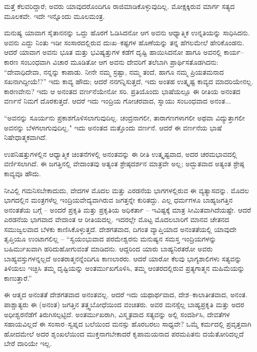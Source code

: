 \vskip 4pt

ಮತ್ತೆ ಕೆಲವರಿದ್ದಾರೆ; ಅವರು ಯಾವುದರೊಂದಿಗೂ ರಾಜಿಮಾಡಿಕೊಳ್ಳುವುದಿಲ್ಲ. ಮೋಕ್ಷಕ್ಕಿರುವ ಮಾರ್ಗ ಸತ್ಯದ ಮೂಲಕವೇ. ಇದೇ ಇನ್ನೊಂದು ಮೂಲಮಂತ್ರ.

\vskip 4pt

ಮನುಷ್ಯ ಯಾವಾಗ ಸೈತಾನನನ್ನು ಒದ್ದು ಹೊರಗೆ ಓಡಿಸಿದನೋ ಆಗ ಅವನು ಆಧ್ಯಾತ್ಮಿಕ ಉನ್ನತಿಯನ್ನು ಸಾಧಿಸಿದನು. ಅವನು ಎದ್ದು ನಿಂತು ಇಡೀ ಸಂಸಾರದಲ್ಲಿರುವ ದುಃಖ–ಕಷ್ಟಗಳ ಹೊಣೆಯನ್ನು ತನ್ನ ಹೆಗಲಮೇಲೆ ಹೇರಿಕೊಂಡನು. ಆದರೆ ಯಾವಾಗ ಅವನು ಭೂತ ಮತ್ತು ಭವಿಷ್ಯತ್ತುಗಳ ಕಡೆಗೆ ದೃಷ್ಟಿ ಹಾಯಿಸಿದನೋ ಹಾಗೂ ಅವನಲ್ಲಿ ಕಾರ್ಯ–ಕಾರಣ ಸಂಬಂಧವಾಗಿ ವಿಚಾರ ಮೂಡಿತೋ ಆಗ ಅವನು ದೇವರಿಗೆ ತಲೆಬಾಗಿ ಪ್ರಾರ್ಥಿಸತೊಡಗಿದನು: “ದೇವಾಧಿದೇವಾ, ನನ್ನನ್ನು ಕಾಪಾಡು. ನೀನೇ ನಮ್ಮ ಸ್ರಷ್ಟಾ, ನಮ್ಮ ತಂದೆ, ಹಾಗೂ ನಮ್ಮ ಪ್ರಿಯತಮನಾದ ಸಖನಾಗಿದ್ದೀಯೆ!?” ಇದು ಕಾವ್ಯ ಹೌದು; ಆದರೆ ನನಗನ್ನಿಸುತ್ತದೆ, ಇದು ಅಂತಹ ಉತ್ಕೃಷ್ಟ ಕಾವ್ಯದ ಮಾದರಿಯೇನಲ್ಲ. ಕಾರಣವೇನು? ಇದು ಆ ಅನಂತದ ವರ್ಣನೆಯೇನೋ ಸರಿ. ಪ್ರತಿಯೊಂದು ಭಾಷೆಯಲ್ಲೂ ಈ ರೀತಿಯ ಅನಂತದ ವರ್ಣನೆ ನಿಮಗೆ ದೊರಕುತ್ತದೆ. ಆದರೆ ಇದು ಇಂದ್ರಿಯ ಗೋಚರವಾದ, ಸ್ನಾಯು ಸಂಬಂಧವಾದ ಅನಂತ...

\vskip 4pt

“ಅವನನ್ನು ಸೂರ್ಯನು ಪ್ರಕಾಶಗೊಳಿಸಲಾಗುವುದಿಲ್ಲ. ಚಂದ್ರನಾಗಲೀ, ತಾರಾಗಣಗಳಾಗಲೀ ಅಥವಾ ವಿದ್ಯುತ್ತಾಗಲೀ ಅವನನ್ನು ಬೆಳಗಲಾಗುವುದಿಲ್ಲ." ಇದು ಅನಂತದ ಮತ್ತೊಂದು ವರ್ಣನೆ. ಆದರೆ ಈ ವರ್ಣನೆಯ ಭಾಷೆ ನಿಷೇಧಾತ್ಮಕವಾಗಿದೆ.

\vskip 4pt

ಉಪನಿಷತ್ತುಗಳಲ್ಲಿನ ಆಧ್ಯಾತ್ಮಿಕ ಚಿಂತನೆಗಳಲ್ಲಿ ಅನಂತವನ್ನು ಈ ರೀತಿ ಉತ್ಕೃಷ್ಟವಾದ, ಅದರ ಚರಮಭಾವದಲ್ಲಿ ವರ್ಣಿಸಲಾಗಿದೆ. ಈ ಜಗತ್ತಿನಲ್ಲಿ ವೇದಾಂತವು ಅತ್ಯಂತ ಶ್ರೇಷ್ಠದರ್ಶನ ಮಾತ್ರವೇ ಅಲ್ಲ; ಅದ್ಭುತವಾದ ಅತ್ಯಂತ ಶ್ರೇಷ್ಠ ಕಾವ್ಯವೂ ಹೌದು.

\vskip 4pt

ನೀವಿಲ್ಲಿ ಗಮನಿಸಬೇಕಾದುದು, ವೇದಗಳ ಮೊದಲ ಮತ್ತು ಎರಡನೆಯ ಭಾಗಗಳಲ್ಲಿರುವ ಈ ವ್ಯತ್ಯಾಸವನ್ನು. ಮೊದಲ ಭಾಗದಲ್ಲಿನ ಮಂತ್ರಗಳೆಲ್ಲ ಇಂದ್ರಿಯವೇದ್ಯವಾಗಿರುವ ಜಗತ್ತನ್ನೇ ಕುರಿತದ್ದು. ಎಲ್ಲ ಧರ್ಮಗಳೂ ಬಾಹ್ಯಜಗತ್ತಿನ ಅನಂತತೆಯ ಬಗ್ಗೆ – ಅಂದರೆ ಪ್ರಕೃತಿ ಮತ್ತು ಪ್ರಕೃತಿಯ ಅಧಿಕರ್ತಾ – ಇವಿಷ್ಟಕ್ಕೆ ಮಾತ್ರ ಸೀಮಿತವಾಗಿದೆಯಷ್ಟೇ. ಆದರೆ ಎರಡನೆಯ ಭಾಗವಾದ ವೇದಾಂತ ಆ ರೀತಿಯದಲ್ಲ. ಇದರಲ್ಲೇ ಮೊಟ್ಟ ಮೊದಲಬಾರಿಗೆ ಮಾನವ ಚೇತನದ ಸಮುಜ್ವಲವಾದ ಬೆಳಕು ಕಾಣಿಸಿಕೊಳ್ಳುತ್ತದೆ. ದೇಶಗತವಾದ, ದಿಗಂತ ವ್ಯಾಪ್ತಿಯಾದ ಅನಂತತೆಯಲ್ಲಿ ಯಾವುದೇ ತೃಪ್ತಿಯೂ ಉಂಟಾಗಲಿಲ್ಲ – “ಸ್ವಯಂಭುವಾದ ಪರಮೇಶ್ವರನು ಮನುಷ್ಯನ ಸಮಸ್ತ ಇಂದ್ರಿಯಗಳನ್ನು ಬಹಿರ್ಮುಖವಾಗಿ ಹರಿದುಹೋಗುವಂತೆ ಮಾಡಿದನು. ಆದ್ದರಿಂದ ಯಾರು ಬಾಹ್ಯನಿರತರೋ ಅವರು ಬಾಹ್ಯವಸ್ತುಗಳನ್ನಲ್ಲದೆ ಅಂತರಾತ್ಮನನ್ನೆಂದಿಗೂ ಕಾಣಲಾರರು. ಆದರೆ ಯಾರೋ ಕೆಲವು ಭಾಗ್ಯಶಾಲಿಗಳು ಸತ್ಯವನ್ನು ತಿಳಿಯಲು ಇಚ್ಛಿಸಿ ತಮ್ಮ ದೃಷ್ಟಿಯನ್ನು ಅಂತರ್ಮುಖಗೊಳಿಸಿ, ತಮ್ಮ ಆಂತರದಲ್ಲಿರುವ ಪ್ರತ್ಯಗಾತ್ಮನ ಮಹಿಮೆಯನ್ನು ಕಾಣುತ್ತಾರೆ.”

\vskip 4pt

ಈ ಆತ್ಮದ ಅನಂತತೆ ದೇಶಗತವಾದ ಅನಂತವಲ್ಲ. ಆದರೆ ಇದು ಯಥಾರ್ಥವಾದ, ದೇಶ–ಕಾಲಾತೀತವಾದ, ಅನಂತ. ಪಾಶ್ಚಾತ್ಯರು ಈ (ಅನಂತ) ಜಗತ್ತಿನ ತತ್ತ್ವಬೋಧೆಯಿಂದ ವಂಚಿತರು. ಅವರ ಮನಸ್ಸೆಲ್ಲ ಬಾಹ್ಯಪ್ರಕೃತಿ ಮತ್ತು ಅದರ ಅಧೀಶ್ವರನೆಡೆಗೆ ತಿರುಗಿಸಲ್ಪಟ್ಟಿದೆ. ಅಂತರ್ಮುಖರಾಗಿ, ವಿಸ್ಮೃತವಾದ ಸತ್ಯವನ್ನು ಅಲ್ಲಿ ಸಂದರ್ಶಿಸಿ, ದೇವತೆಗಳ ಸಹಾಯವಿಲ್ಲದೆ ಈ ಸಂಸಾರ–ಸ್ವಪ್ನದ ಬಲೆಯಿಂದ ಮನಸ್ಸು ಹೊರಬರಲು ಸಾಧ್ಯವೇ? ಒಮ್ಮೆ ಕರ್ಮದಲ್ಲಿ ಪ್ರವೃತ್ತವಾಗಿ ಹೋದಮೇಲೆ ಅದರ ಶೃಂಖಲೆಯಿಂದ ಮುಕ್ತನಾಗಬೇಕಾದರೆ ಕೃಪಾಮಯನಾದ ಪರಮಪಿತನು ದಯೆತೋರಿದಲ್ಲದೆ ಬೇರೆ ದಾರಿಯೇ ಇಲ್ಲ.

